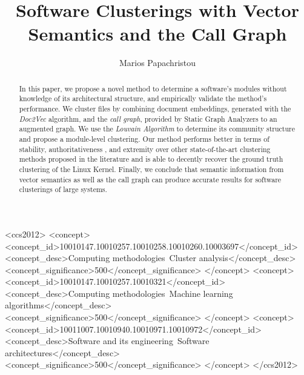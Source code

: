 \documentclass[sigconf, screen]{acmart}
\begin{document}
%
\title{Software Clusterings with Vector Semantics and 
the Call Graph}

%
\author{Marios Papachristou}


\renewcommand{\shortauthors}{Papachristou}

\begin{abstract}

In this paper, we propose a novel method to determine a software's modules without knowledge of its architectural structure, and empirically validate the method's performance. We cluster files by combining document embeddings, generated with the  \emph{Doc2Vec} algorithm, and the \emph{call graph}, provided by Static Graph Analyzers to an augmented graph. We use the \emph{Louvain Algorithm} to determine its community structure and propose a module-level clustering. 
Our method performs better in terms of stability, authoritativeness 
, and extremity over other state-of-the-art clustering methods proposed in the literature and is able to decently 
recover the ground truth clustering of the Linux Kernel. 
Finally, we conclude that semantic information from vector semantics as well as the call graph can produce 
accurate results for software clusterings of large systems.

\end{abstract}

%
%
\begin{CCSXML}
<ccs2012>
<concept>
<concept_id>10010147.10010257.10010258.10010260.10003697</concept_id>
<concept_desc>Computing methodologies~Cluster analysis</concept_desc>
<concept_significance>500</concept_significance>
</concept>
<concept>
<concept_id>10010147.10010257.10010321</concept_id>
<concept_desc>Computing methodologies~Machine learning algorithms</concept_desc>
<concept_significance>500</concept_significance>
</concept>
<concept>
<concept_id>10011007.10010940.10010971.10010972</concept_id>
<concept_desc>Software and its engineering~Software architectures</concept_desc>
<concept_significance>500</concept_significance>
</concept>
</ccs2012>
\end{CCSXML}
\end{document}
